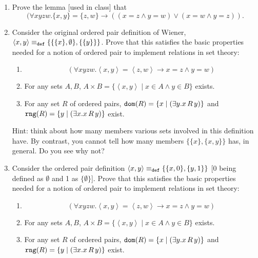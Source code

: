 \documentclass[12pt]{book}
\begin{document}
\begin{enumerate}

\item  Prove the lemma [used in class] that $$(\forall xyzw.\{x,y\} = \{z,w\} \rightarrow ((x=z \wedge y =w)\vee (x=w \wedge y=z)).$$ 

\item  Consider the original  ordered pair definition of Wiener, $\left<x,y\right> \equiv_{\tt def} \{\{\{x\},\emptyset\},\{\{y\}\}\}$.  Prove that this satisfies the basic properties needed for a notion of ordered pair to implement relations in set theory:

\begin{enumerate}

\item $$(\forall xyzw.\left<x,y\right>=\left<z,w\right> \rightarrow x=z \wedge y=w)$$

\item  For any sets $A,B$, $A \times B = \{\left<x,y\right>\mid x \in A \wedge y \in B\}$ exists.

\item For any set $R$ of ordered pairs, ${\tt dom}(R) = \{x \mid (\exists y.x\,R\,y)\}$ and  ${\tt rng}(R) = \{y \mid (\exists x.x\,R\,y)\}$ exist.

\end{enumerate}

Hint:  think about how many members various sets involved in this definition have.  By contrast, you cannot tell how many members $\{\{x\},\{x,y\}\}$ has, in general.  Do you see why not?


\item  Consider the ordered pair definition $\left<x,y\right> \equiv_{\tt def} \{\{x,0\},\{y,1\}\}$ [0 being defined as $\emptyset$ and 1 as $\{\emptyset\}$]. Prove that this satisfies the basic properties needed for a notion of ordered pair to implement relations in set theory:

\begin{enumerate}

\item $$(\forall xyzw.\left<x,y\right>=\left<z,w\right> \rightarrow x=z \wedge y=w)$$

\item  For any sets $A,B$, $A \times B = \{\left<x,y\right>\mid x \in A \wedge y \in B\}$ exists.

\item For any set $R$ of ordered pairs, ${\tt dom}(R) = \{x \mid (\exists y.x\,R\,y)\}$ and  ${\tt rng}(R) = \{y \mid (\exists x.x\,R\,y)\}$ exist.  


\end{enumerate}
\end{enumerate}
\end{document}
